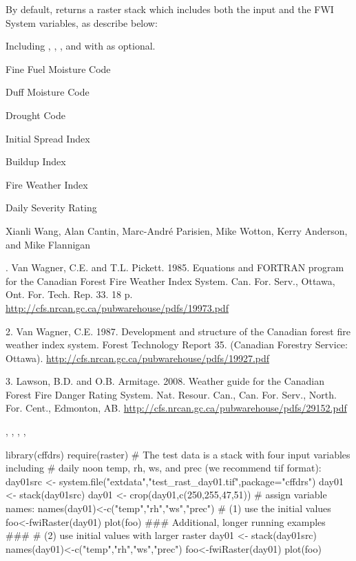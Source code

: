 \documentclass[a4paper]{book}
\begin{document}
%
\begin{Value}
By default,  returns a raster stack which includes both
the input and the FWI System variables, as describe below: \begin{ldescription}
\item[\code{Inputs
}] Including , , , and  with
 as optional.\item[\code{ffmc }] Fine Fuel Moisture Code\item[\code{dmc
}] Duff Moisture Code\item[\code{dc }] Drought Code\item[\code{isi }] Initial Spread
Index\item[\code{bui }] Buildup Index\item[\code{fwi }] Fire Weather Index\item[\code{dsr
}] Daily Severity Rating
\end{ldescription}
\end{Value}
%
\begin{Author}\relax
Xianli Wang, Alan Cantin, Marc-André Parisien, Mike Wotton, Kerry
Anderson, and Mike Flannigan
\end{Author}
%
\begin{References}. Van Wagner, C.E. and T.L. Pickett. 1985. Equations and
FORTRAN program for the Canadian Forest Fire Weather Index System. Can. For.
Serv., Ottawa, Ont. For. Tech. Rep. 33. 18 p.
\url{http://cfs.nrcan.gc.ca/pubwarehouse/pdfs/19973.pdf}

2. Van Wagner, C.E. 1987. Development and structure of the Canadian forest
fire weather index system. Forest Technology Report 35. (Canadian Forestry
Service: Ottawa). \url{http://cfs.nrcan.gc.ca/pubwarehouse/pdfs/19927.pdf}

3.  Lawson, B.D. and O.B. Armitage. 2008. Weather guide for the Canadian
Forest Fire Danger Rating System. Nat. Resour. Can., Can. For. Serv., North.
For. Cent., Edmonton, AB.
\url{http://cfs.nrcan.gc.ca/pubwarehouse/pdfs/29152.pdf}
\end{References}
%
\begin{SeeAlso}\relax
{}, , ,
, 
\end{SeeAlso}
%
\begin{Examples}
\begin{ExampleCode}

library(cffdrs)
require(raster)
# The test data is a stack with four input variables including 
# daily noon temp, rh, ws, and prec (we recommend tif format):
day01src <- system.file("extdata","test_rast_day01.tif",package="cffdrs")
day01 <- stack(day01src)
day01 <- crop(day01,c(250,255,47,51))
# assign variable names:
names(day01)<-c("temp","rh","ws","prec")
# (1) use the initial values
foo<-fwiRaster(day01)
plot(foo)
### Additional, longer running examples ###
# (2) use initial values with larger raster
day01 <- stack(day01src)
names(day01)<-c("temp","rh","ws","prec")
foo<-fwiRaster(day01)
plot(foo)

\end{ExampleCode}
\end{Examples}
\end{document}
